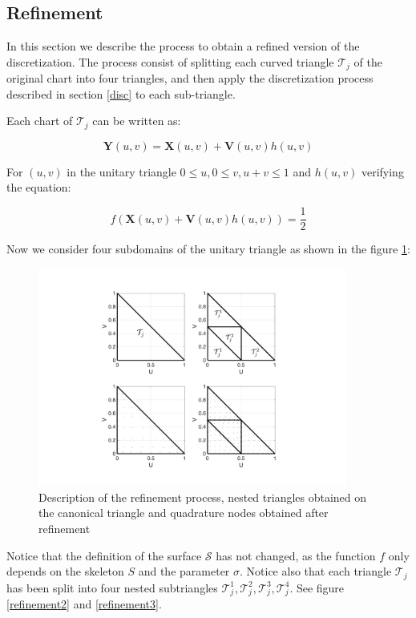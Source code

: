 \documentclass[11pt]{article}
\newcommand\bX{\boldsymbol X}
\newcommand\bY{\boldsymbol Y}
\newcommand\bV{\boldsymbol V}
\begin{document}
\subsection{Refinement}

In this section we describe the process to obtain a refined version of the discretization. The process consist of splitting each curved triangle  $\mathcal{T}_j$ of the original chart into four triangles, and then apply the discretization process described in section \ref{disc} to each sub-triangle.

Each chart of $\mathcal{T}_j$ can be written as:

\begin{equation}
\bY(u,v)=\bX(u,v)+\bV(u,v)h(u,v)
\end{equation}

For $(u,v)$ in the unitary triangle $0\le u, 0\le v, u+v\le1$ and $h(u,v)$ verifying the equation:

\begin{equation}
f(\bX(u,v)+\bV(u,v)h(u,v))=\frac{1}{2}
\end{equation}

Now we consider four subdomains of the unitary triangle as shown in the figure \ref{refinement1}:

\begin{figure}[H]
\begin{center}
\includegraphics[width=4in]{Triangle_Refine_v2.pdf}
\end{center}
\caption{Description of the refinement process, nested triangles obtained on the canonical triangle and quadrature nodes obtained after refinement}
\label{refinement1}
\end{figure}

Notice that the definition of the surface $\mathcal{S}$ has not changed, as the function $f$ only depends on the skeleton $\mathit{S}$ and the parameter $\sigma$. Notice also that each triangle $\mathcal{T}_j$ has been split into four nested subtriangles $\mathcal{T}_j^1,\mathcal{T}_j^2,\mathcal{T}_j^3,\mathcal{T}_j^4$. See figure \ref{refinement2} and \ref{refinement3}.
\end{document}
